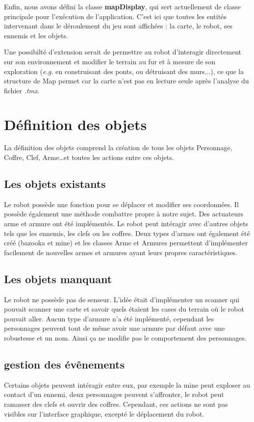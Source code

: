 \documentclass[a4paper 12pts]{article}
\begin{document}
Enfin, nous avons défini la classe \textbf{mapDisplay}, qui sert actuellement de classe principale pour l'exécution de l'application. C'est ici que toutes les entités intervenant dans le déroulement du jeu sont affichées : la carte, le robot, ses ennemis et les objets.

Une possibilté d'extension serait de permettre au robot d'interagir directement sur son environnement et modifier le terrain au fur et à mesure de son exploration (\emph{e.g.} en construisant des ponts, ou détruisant des murs...), ce que la structure de Map permet car la carte n'est pas en lecture seule après l'analyse du fichier \emph{.tmx}. 



\section{Définition des objets}
La définition des objets comprend la création de tous les objets Personnage, Coffre, Clef, Arme\ldots et toutes les actions entre ces objets.

\subsection{Les objets existants}
Le robot possède une fonction pour se déplacer et modifier ses coordonnées. Il possède également une méthode combattre propre à notre sujet. Des actuateurs arme et armure ont été implémentés. Le robot peut intéragir avec d'autres objets tels que les ennemis, les clefs ou les coffres. Deux types d'armes ont également été créé (bazooka et mine) et les classes Arme et Armures permettent d'implémenter facilement de nouvelles armes et armures ayant leurs propres caractéristiques.

\subsection{Les objets manquant}
Le robot ne possède pas de senseur. L'idée était d'implémenter un scanner qui pouvait scanner une carte et savoir quels étaient les cases du terrain où le robot pouvait aller. Aucun type d'armure n'a été implémenté, cependant les personnages peuvent tout de même avoir une armure par défaut avec une robustesse et un nom. Ainsi ça ne modifie pas le comportement des personnages.

\subsection{gestion des évênements}
Certains objets peuvent intéragir entre eux, par exemple la mine peut exploser au contact d'un ennemi, deux personnages peuvent s'affronter, le robot peut ramasser des clefs et ouvrir des coffres. Cependant, ces actions ne sont pas visibles sur l'interface graphique, excepté le déplacement du robot.
\end{document}
